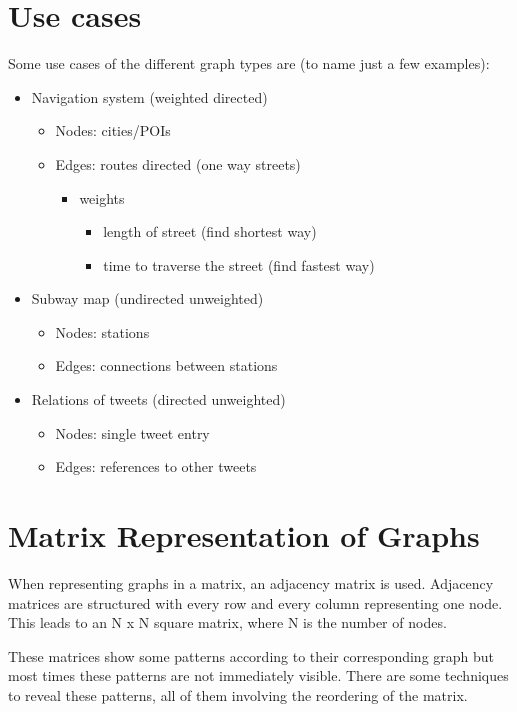 \section{Use cases}
Some use cases of the different graph types are (to name just a few examples):
\begin{itemize}
\item Navigation system (weighted directed)
	\begin{itemize}
		\item Nodes: cities/POIs
		\item Edges: routes directed (one way streets)
		\begin{itemize}
			\item weights
			\begin{itemize}
				\item length of street (find shortest way)
				\item time to traverse the street (find fastest way)
			\end{itemize}		
		\end{itemize}
	\end{itemize}		
\item Subway map (undirected unweighted)
\begin{itemize}
	\item Nodes: stations
	\item Edges: connections between stations
\end{itemize}
\item Relations of tweets (directed unweighted)
\begin{itemize}
	\item Nodes: single tweet entry
	\item Edges: references to other tweets
\end{itemize}
\end{itemize}


\section{Matrix Representation of Graphs}

When representing graphs in a matrix, an adjacency matrix is used. Adjacency matrices are structured with every row and every column representing one node. This leads to an N x N square matrix, where N is the number of nodes. 

These matrices show some patterns according to their corresponding graph but most times these patterns are not immediately visible. There are some techniques to reveal these patterns, all of them involving the reordering of the matrix.


